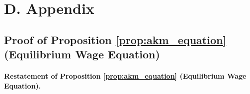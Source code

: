 

\clearpage
\section{D. {\sectionfive} Appendix\label{app:numerical}}
\renewcommand*{\thepage}{\Alph{section}\arabic{page}}
\setcounter{page}{1}


\subsection{Proof of Proposition \ref{prop:akm_equation} (Equilibrium Wage Equation)\label{app:proof_prop_akm_equation}}

\paragraph{Restatement of Proposition \ref{prop:akm_equation} (Equilibrium Wage Equation).}

